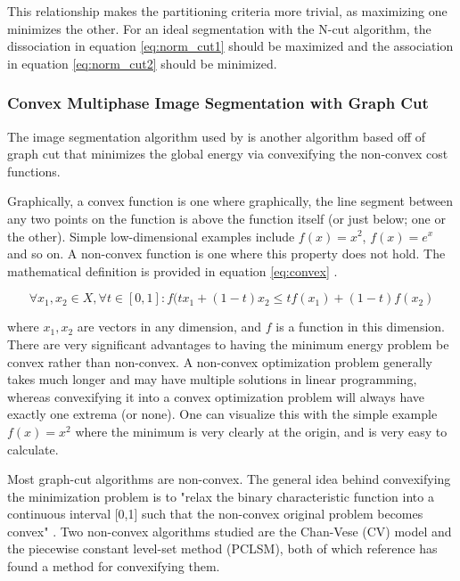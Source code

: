 \documentclass{article}
\begin{document}
This relationship makes the partitioning criteria more trivial, as maximizing one minimizes the other. For an ideal segmentation with the N-cut algorithm, the dissociation in equation \ref{eq:norm_cut1} should be maximized and the association in equation \ref{eq:norm_cut2} should be minimized.




\subsubsection*{Convex Multiphase Image Segmentation with Graph Cut}

The image segmentation algorithm used by \cite{jun} is another algorithm based off of graph cut that minimizes the global energy via convexifying the non-convex cost functions.

Graphically, a convex function is one where graphically, the line segment between any two points on the function is above the function itself (or just below; one or the other). Simple low-dimensional examples include $f(x)=x^2$, $f(x)=e^x$ and so on. A non-convex function is one where this property does not hold. The mathematical definition is provided in equation \ref{eq:convex} \cite{convex}.

\begin{equation}
\forall x_1,x_2 \in X, \forall t\in [0,1]: f(tx_1 + (1-t)x_2 \leq tf(x_1) + (1-t)f(x_2)
\label{eq:convex}
\end{equation}

where $x_1,x_2$ are vectors in any dimension, and $f$ is a function in this dimension. There are very significant advantages to having the minimum energy problem be convex rather than non-convex. A non-convex optimization problem generally takes much longer and may have multiple solutions in linear programming, whereas convexifying it into a convex optimization problem will always have exactly one extrema (or none). One can visualize this with the simple example $f(x)=x^2$ where the minimum is very clearly at the origin, and is very easy to calculate.

Most graph-cut algorithms are non-convex. The general idea behind convexifying the minimization problem is to "relax the binary characteristic function into a continuous interval [0,1] such that the non-convex original problem becomes convex" \cite{jun}. Two non-convex algorithms studied are the Chan-Vese (CV) model and the piecewise constant level-set method (PCLSM), both of which reference \cite{jun} has found a method for convexifying them.
\end{document}
